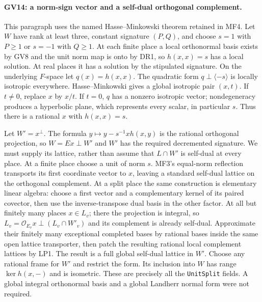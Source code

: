 \paragraph{GV14: a norm-sign vector and a self-dual orthogonal complement.}
This paragraph uses the named Hasse--Minkowski theorem retained in MF4.
Let $W$ have rank at least three, constant signature $(P,Q)$, and
choose $s=1$ with $P\ge1$ or $s=-1$ with $Q\ge1$.
At each finite place a local orthonormal basis exists by GV8 and the
unit norm map is onto by DR1, so $h(x,x)=s$ has a local solution.
At real places it has a solution by the stipulated signature.
On the underlying $F$-space let $q(x)=h(x,x)$.
The quadratic form $q\perp\langle-s\rangle$ is locally isotropic
everywhere. Hasse--Minkowski gives a global isotropic pair $(x,t)$.
If $t\ne0$, replace $x$ by $x/t$. If $t=0$, $q$ has a nonzero
isotropic vector; nondegeneracy produces a hyperbolic plane, which
represents every scalar, in particular $s$. Thus there is a rational
$x$ with $h(x,x)=s$.

Let $W'=x^\perp$. The formula
$y\mapsto y-s^{-1}x h(x,y)$ is the rational orthogonal projection,
so $W=Ex\perp W'$ and $W'$ has the required decremented signature.
We must supply its lattice, rather than assume that $L\cap W'$
is self-dual at every place. At a finite place choose a unit of norm
$s$. MF3's equal-norm reflection transports its first coordinate
vector to $x$, leaving a standard self-dual lattice on the
orthogonal complement. At a split place the same construction is
elementary linear algebra: choose a first vector and a complementary
kernel of its paired covector, then use the inverse-transpose dual
basis in the other factor. At all but finitely many places $x\in L_v$;
there the projection is integral, so
$L_v=\mathcal O_{E_v}x\perp(L_v\cap W'_v)$ and its complement is
already self-dual. Approximate their finitely many exceptional completed bases by rational
bases inside the same open lattice transporter, then patch the resulting
rational local complement lattices by LP1. The result is a full global self-dual lattice in
$W'$. Choose any rational frame for $W'$ and restrict the form.
Its inclusion into $W$ has range $\ker h(x,-)$ and is isometric.
These are precisely all the \texttt{UnitSplit} fields. A global
integral orthonormal basis and a global Landherr normal form were
not required.

